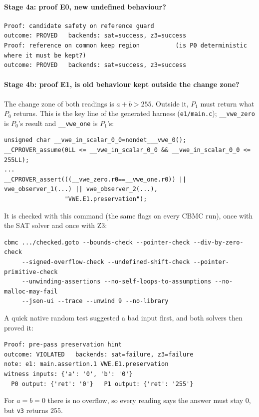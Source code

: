 \documentclass[10pt,a4paper]{article}
\newcommand{\Pz}{P_0}\newcommand{\Po}{P_1}
\begin{document}
\paragraph{Stage 4a: proof E0, new undefined behaviour?}\mbox{}\par
\begin{lstlisting}[language={}]
Proof: candidate safety on reference guard
outcome: PROVED   backends: sat=success, z3=success
Proof: reference on common keep region          (is P0 deterministic where it must be kept?)
outcome: PROVED   backends: sat=success, z3=success
\end{lstlisting}

\paragraph{Stage 4b: proof E1, is old behaviour kept outside the change zone?} The change zone of
both readings is $a+b>255$. Outside it, $\Po$ must return what $\Pz$ returns. This is the key line
of the generated harness (\texttt{e1/main.c}); \texttt{\_\_vwe\_zero} is $\Pz$'s result and
\texttt{\_\_vwe\_one} is $\Po$'s:
\begin{lstlisting}[language={}]
unsigned char __vwe_in_scalar_0_0=nondet___vwe_0();
__CPROVER_assume(0LL <= __vwe_in_scalar_0_0 && __vwe_in_scalar_0_0 <= 255LL);
...
__CPROVER_assert(((__vwe_zero.r0==__vwe_one.r0)) || vwe_observer_1(...) || vwe_observer_2(...),
                 "VWE.E1.preservation");
\end{lstlisting}
It is checked with this command (the same flags on every CBMC run), once with the SAT solver and
once with Z3:
\begin{lstlisting}[language={}]
cbmc .../checked.goto --bounds-check --pointer-check --div-by-zero-check
     --signed-overflow-check --undefined-shift-check --pointer-primitive-check
     --unwinding-assertions --no-self-loops-to-assumptions --no-malloc-may-fail
     --json-ui --trace --unwind 9 --no-library
\end{lstlisting}
A quick native random test suggested a bad input first, and both solvers then proved it:
\begin{lstlisting}[language={}]
Proof: pre-pass preservation hint
outcome: VIOLATED   backends: sat=failure, z3=failure
note: e1: main.assertion.1 VWE.E1.preservation
witness inputs: {'a': '0', 'b': '0'}
  P0 output: {'ret': '0'}   P1 output: {'ret': '255'}
\end{lstlisting}
For $a=b=0$ there is no overflow, so every reading says the answer must stay $0$, but \texttt{v3}
returns $255$.
\end{document}

